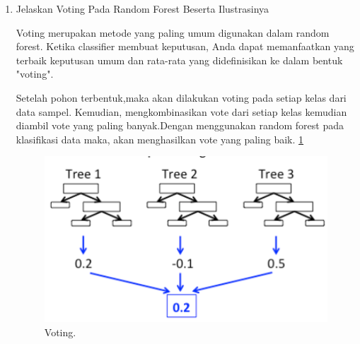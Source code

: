 \begin{enumerate}
\begin {enumerate}
 a= 5

 b= 1

 c= 1

 d= 3

Kemudian kita dapat mencari nilai Recall, Precision, accuracy dan Error Rate

 Recall =3/(1+3) = 0,75

 Precision = 3/(1+3) = 0,75

 Accuracy =(5+3)/(5+1+1+3) = 0,8

 Error Rate =(1+1)/(5+1+1+3) = 0,2

\end {enumerate}

\item Jelaskan Voting Pada Random Forest Beserta Ilustrasinya 
\par Voting merupakan metode yang paling umum digunakan dalam random forest. Ketika classifier membuat keputusan, Anda dapat memanfaatkan yang terbaik keputusan umum dan rata-rata yang didefinisikan ke dalam bentuk "voting".
\par Setelah pohon terbentuk,maka akan dilakukan voting pada setiap kelas dari data sampel. Kemudian, mengkombinasikan vote dari setiap kelas kemudian diambil vote yang paling banyak.Dengan menggunakan random forest pada klasifikasi data maka, akan menghasilkan vote yang paling baik. \ref{AFS6}
		\begin{figure}[ht]
		\centerline{\includegraphics[width=1\textwidth]{figures/AFS/6.png}}
		\caption{Voting.}
		\label{AFS6}
		\end{figure}
\end{enumerate}